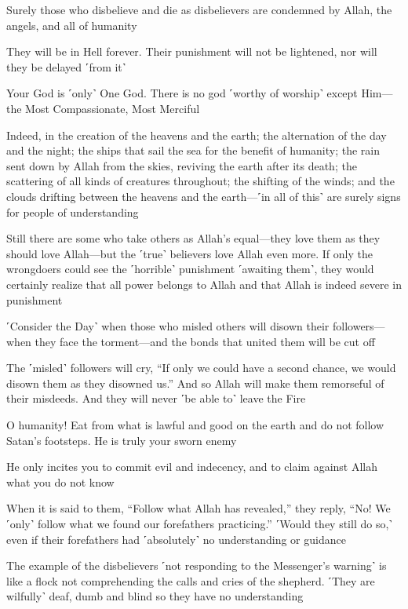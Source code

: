 Surely those who disbelieve and die as disbelievers are condemned by Allah, the angels, and all of humanity

They will be in Hell forever. Their punishment will not be lightened, nor will they be delayed ˹from it˺

Your God is ˹only˺ One God. There is no god ˹worthy of worship˺ except Him—the Most Compassionate, Most Merciful

Indeed, in the creation of the heavens and the earth; the alternation of the day and the night; the ships that sail the sea for the benefit of humanity; the rain sent down by Allah from the skies, reviving the earth after its death; the scattering of all kinds of creatures throughout; the shifting of the winds; and the clouds drifting between the heavens and the earth—˹in all of this˺ are surely signs for people of understanding

Still there are some who take others as Allah’s equal—they love them as they should love Allah—but the ˹true˺ believers love Allah even more. If only the wrongdoers could see the ˹horrible˺ punishment ˹awaiting them˺, they would certainly realize that all power belongs to Allah and that Allah is indeed severe in punishment

˹Consider the Day˺ when those who misled others will disown their followers—when they face the torment—and the bonds that united them will be cut off

The ˹misled˺ followers will cry, “If only we could have a second chance, we would disown them as they disowned us.” And so Allah will make them remorseful of their misdeeds. And they will never ˹be able to˺ leave the Fire

O humanity! Eat from what is lawful and good on the earth and do not follow Satan’s footsteps. He is truly your sworn enemy

He only incites you to commit evil and indecency, and to claim against Allah what you do not know

When it is said to them, “Follow what Allah has revealed,” they reply, “No! We ˹only˺ follow what we found our forefathers practicing.” ˹Would they still do so,˺ even if their forefathers had ˹absolutely˺ no understanding or guidance

The example of the disbelievers ˹not responding to the Messenger’s warning˺ is like a flock not comprehending the calls and cries of the shepherd. ˹They are wilfully˺ deaf, dumb and blind so they have no understanding

